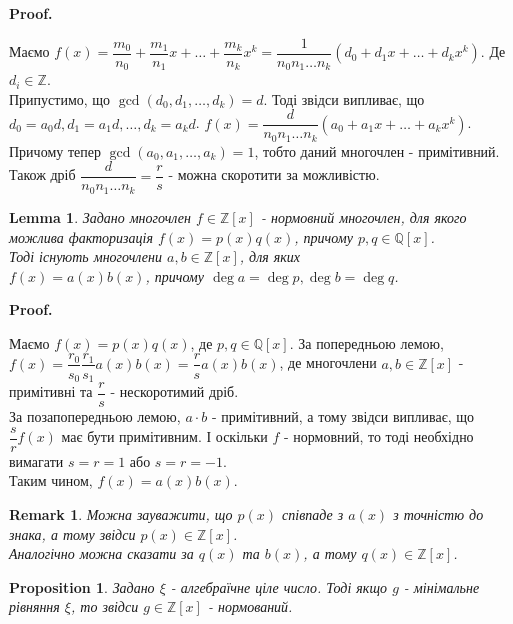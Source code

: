 \documentclass[a4paper, 10pt]{article}
\makeatletter
\theoremstyle{theoremdd}
\theoremstyle{theoremdd}
\theoremstyle{theoremdd}
\theoremstyle{theoremdd}
\theoremstyle{theoremdd}
\newtheorem{proposition}[theorem]{Proposition}
\theoremstyle{theoremdd}
\newtheorem{remark}[theorem]{Remark}
\theoremstyle{theoremdd}
\newtheorem{lemma}[theorem]{Lemma}
\theoremstyle{theoremdd}
\renewenvironment{proof}[1][Proof.\\]{\par
\pushQED{\hfill \qed}%
\normalfont \topsep6\p@\@plus6\p@\relax
\trivlist
\item\relax
{\bfseries
#1\@addpunct{.}}\hspace\labelsep\ignorespaces
}{%
\popQED\endtrivlist\@endpefalse
}
\makeatother
\begin{document}
\begin{proof}
Маємо $f(x) = \dfrac{m_0}{n_0} + \dfrac{m_1}{n_1}x + \dots + \dfrac{m_k}{n_k}x^k = \dfrac{1}{n_0n_1\dots n_k} \left( d_0 + d_1 x + \dots + d_kx^k \right)$.
Де $d_i \in \mathbb{Z}$.\\
Припустимо, що $\gcd(d_0,d_1,\dots,d_k) = d$. Тоді звідси випливає, що \\
$d_0 = a_0d, d_1 = a_1d, \dots, d_k = a_kd$.
$f(x) = \dfrac{d}{n_0n_1\dots n_k} (a_0 + a_1x+\dots+a_kx^k)$.\\
Причому тепер $\gcd(a_0,a_1,\dots,a_k) = 1$, тобто даний многочлен - примітивний.\\
Також дріб $\dfrac{d}{n_0n_1 \dots n_k} = \dfrac{r}{s}$ - можна скоротити за можливістю.
\end{proof}

\begin{lemma}
Задано многочлен $f \in \mathbb{Z}[x]$ - нормовний многочлен, для якого можлива факторизація $f(x) = p(x)q(x)$, причому $p,q \in \mathbb{Q}[x]$.\\
Тоді існують многочлени $a,b \in \mathbb{Z}[x]$, для яких \\
$f(x) = a(x)b(x)$, причому $\deg a = \deg p, \deg b = \deg q$.
\end{lemma}

\begin{proof}
Маємо $f(x) = p(x) q(x)$, де $p,q \in \mathbb{Q}[x]$. За попередньою лемою,\\
$f(x) = \dfrac{r_0}{s_0} \dfrac{r_1}{s_1} a(x)b(x) = \dfrac{r}{s} a(x)b(x)$, де многочлени $a,b \in \mathbb{Z}[x]$ - примітивні та $\dfrac{r}{s}$ - нескоротимий дріб.\\
За позапопередньою лемою, $a \cdot b$ - примітивний, а тому звідси випливає, що $\dfrac{s}{r}f(x)$ має бути примітивним. І оскільки $f$ - нормовний, то тоді необхідно вимагати $s = r = 1$ або $s = r = -1$.\\
Таким чином, $f(x) = a(x)b(x)$.
\end{proof}

\begin{remark}
Можна зауважити, що $p(x)$ співпаде з $a(x)$ з точністю до знака, а тому звідси $p(x) \in \mathbb{Z}[x]$.\\
Аналогічно можна сказати за $q(x)$ та $b(x)$, а тому $q(x) \in \mathbb{Z}[x]$.
\end{remark}

\begin{proposition}
Задано $\xi$ - алгебраїчне ціле число. Тоді якщо $g$ - мінімальне рівняння $\xi$, то звідси $g \in \mathbb{Z}[x]$ - нормований.
\end{proposition}
\end{document}
